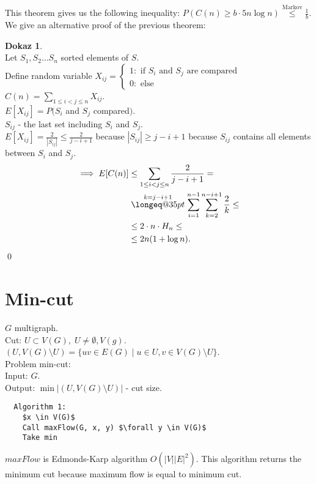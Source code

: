 \documentclass[a4paper, 12pt]{book}
\makeatletter
\theoremstyle{definition}
\newtheorem{pro}[counter]{Dokaz}
\theoremstyle{remark}
\newcommand{\longeq}[1]{\mathrel{\mathpalette\longeq@{#1}}}
\newcommand{\longeq@}[2]{%
  \begingroup
  \sbox\z@{$\m@th#1=$}%
  \ifdim#2<\wd\z@
    \resizebox{#2}{\height}{\box\z@}%
  \else
    \ifdim#2<3\wd\z@
      \hbox to #2{$\m@th#1=\hss=\hss=\hss=$}%
    \else
      \hbox to #2{$\m@th#1=\cleaders\hbox to 0.2\wd\z@{\hss$#1=$\hss}\hfil=$}%
    \fi
  \fi
  \endgroup
}
\makeatother
\begin{document}
This theorem gives us the following inequality: $P\left(C(n) \geq b \cdot 5n \log n\right) \stackrel{\text{Markov}}{\leq} \frac{1}{b}$.
We give an alternative proof of the previous theorem:
\begin{pro} \text{} \\
  Let $S_1, S_2 \dots S_n$ sorted elements of $S$. \\
  Define random variable
  $X_{ij} = \begin{cases}
    1: \text{ if $S_i$ and $S_j$ are compared} \\
    0: \text{ else}
  \end{cases}$ \\
  $C(n) = \sum_{1 \leq i < j \leq n}X_{ij}$. \\
  $E[X_{ij}] = P(S_i$ and $S_j$ compared$)$. \\
  $S_{ij}$ - the last set including $S_i$ and $S_j$. \\
  $E[X_{ij}] = \frac{2}{|S_{ij}|} \leq \frac{2}{j-i+1}$ because $|S_{ij}| \geq j - i + 1$ because $S_{ij}$ contains all elements between $S_i$ and $S_j$. \\
  \begin{align*}
    \implies E[C(n)] &\leq \sum_{1 \leq i < j \leq n} \frac{2}{j-i+1} = \\
    &\stackrel{k=j-i+1}{\longeq{35pt}} \sum_{i=1}^{n-1} \sum_{k=2}^{n-i+1} \frac{2}{k} \leq \\
    &\leq 2 \cdot n \cdot H_n \leq \\
    &\leq 2 n (1 + \log n).
  \end{align*}
  \qed
\end{pro}



\section{Min-cut}

$G$ multigraph. \\
Cut: $U \subset V(G), \; U \neq \emptyset, V(g)$. \\
$(U, V(G) \setminus U) = \{uv \in E(G) \mid u \in U, v \in V(G) \setminus U\}$. \\
Problem min-cut: \\
Input: $G$. \\
Output: $\min |(U, V(G) \setminus U)|$ - cut size.
\begin{lstlisting}
  Algorithm 1:
    $x \in V(G)$
    Call maxFlow(G, x, y) $\forall y \in V(G)$
    Take min
\end{lstlisting}
$maxFlow$ is Edmonds-Karp algorithm $O\left(|V| |E|^2\right)$.
This algorithm returns the minimum cut because maximum flow is equal to minimum cut. 
\end{document}
